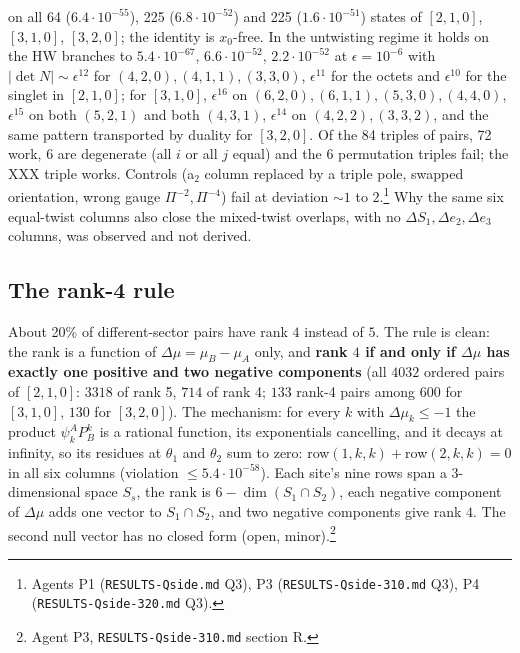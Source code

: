 \documentclass[11pt]{article}
\begin{document}
on all 64 ($6.4\cdot10^{-55}$), 225 ($6.8\cdot10^{-52}$) and 225 ($1.6\cdot10^{-51}$) states of $[2,1,0]$, $[3,1,0]$, $[3,2,0]$; the identity is $x_0$-free.
In the untwisting regime it holds on the HW branches to $5.4\cdot10^{-67}$, $6.6\cdot10^{-52}$, $2.2\cdot10^{-52}$ at $\epsilon=10^{-6}$ with $|\det N|\sim\epsilon^{12}$ for $(4,2,0),(4,1,1),(3,3,0)$, $\epsilon^{11}$ for the octets and $\epsilon^{10}$ for the singlet in $[2,1,0]$; for $[3,1,0]$, $\epsilon^{16}$ on $(6,2,0),(6,1,1),(5,3,0),(4,4,0)$, $\epsilon^{15}$ on both $(5,2,1)$ and both $(4,3,1)$, $\epsilon^{14}$ on $(4,2,2),(3,3,2)$, and the same pattern transported by duality for $[3,2,0]$. Of the 84 triples of pairs, 72 work, 6 are degenerate (all $i$ or all $j$ equal) and the 6 permutation triples fail; the XXX triple works.
Controls (a$_2$ column replaced by a triple pole, swapped orientation, wrong gauge $\Pi^{-2},\Pi^{-4}$) fail at deviation $\sim1$ to $2$.\footnote{Agents P1 (\texttt{RESULTS-\allowbreak{}Qside.\allowbreak{}md} Q3), P3 (\texttt{RESULTS-\allowbreak{}Qside-\allowbreak{}310.\allowbreak{}md} Q3), P4 (\texttt{RESULTS-\allowbreak{}Qside-\allowbreak{}320.\allowbreak{}md} Q3).} Why the same six equal-twist columns also close the mixed-twist overlaps, with no $\Delta S_1,\Delta e_2,\Delta e_3$ columns, was observed and not derived.

\subsection{The rank-4 rule}\label{sec:rank4}

About 20\% of different-sector pairs have rank $4$ instead of $5$. The rule is clean: the rank is a function of $\Delta\mu=\mu_B-\mu_A$ only, and \textbf{rank $4$ if and only if $\Delta\mu$ has exactly one positive and two negative components} (all $4032$ ordered pairs of $[2,1,0]$: $3318$ of rank 5, $714$ of rank 4; $133$ rank-4 pairs among $600$ for $[3,1,0]$, $130$ for $[3,2,0]$).
The mechanism: for every $k$ with $\Delta\mu_k\le-1$ the product $\psi_k^AP_B^k$ is a rational function, its exponentials cancelling, and it decays at infinity, so its residues at $\theta_1$ and $\theta_2$ sum to zero: row$(1,k,k)+$row$(2,k,k)=0$ in all six columns (violation $\le5.4\cdot10^{-58}$).
Each site's nine rows span a 3-dimensional space $S_s$, the rank is $6-\dim(S_1\cap S_2)$, each negative component of $\Delta\mu$ adds one vector to $S_1\cap S_2$, and two negative components give rank $4$. The second null vector has no closed form (open, minor).\footnote{Agent P3, \texttt{RESULTS-\allowbreak{}Qside-\allowbreak{}310.\allowbreak{}md} section R.}
\end{document}
